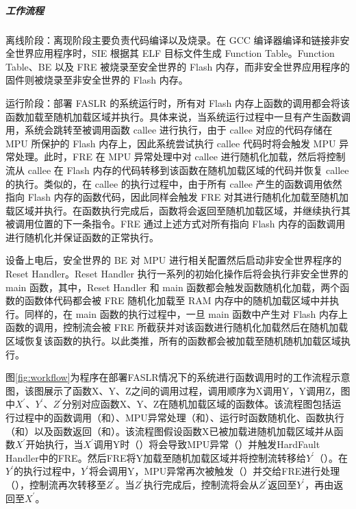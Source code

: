 \documentclass[UTF8,12pt,a4paper]{ctexart}
\numberwithin{figure}{section}
\begin{document}
\subparagraph{工作流程}
\par 离线阶段：离现阶段主要负责代码编译以及烧录。在 GCC 编译器编译和链接非安全世界应用程序时，SIE 根据其 ELF 目标文件生成 Function Table。Function Table、BE 以及 FRE 被烧录至安全世界的 Flash 内存，而非安全世界应用程序的固件则被烧录至非安全世界的 Flash 内存。
\par 运行阶段：部署 FASLR 的系统运行时，所有对 Flash 内存上函数的调用都会将该函数加载至随机加载区域并执行。具体来说，当系统运行过程中一旦有产生函数调用，系统会跳转至被调用函数 callee 进行执行，由于 callee 对应的代码存储在 MPU 所保护的 Flash 内存上，因此系统尝试执行 callee 代码时将会触发 MPU 异常处理。此时，FRE 在 MPU 异常处理中对 callee 进行随机化加载，然后将控制流从 callee 在 Flash 内存的代码转移到该函数在随机加载区域的代码并恢复 callee 的执行。类似的，在 callee 的执行过程中，由于所有 callee 产生的函数调用依然指向 Flash 内存的函数代码，因此同样会触发 FRE 对其进行随机化加载至随机加载区域并执行。在函数执行完成后，函数将会返回至随机加载区域，并继续执行其被调用位置的下一条指令。FRE 通过上述方式对所有指向 Flash 内存的函数调用进行随机化并保证函数的正常执行。
\par 设备上电后，安全世界的 BE 对 MPU 进行相关配置然后启动非安全世界程序的 Reset Handler。Reset Handler 执行一系列的初始化操作后将会执行非安全世界的 main 函数，其中，Reset Handler 和 main 函数都会触发函数随机化加载，两个函数的函数体代码都会被 FRE 随机化加载至 RAM 内存中的随机加载区域中并执行。同样的，在 main 函数的执行过程中，一旦 main 函数中产生对 Flash 内存上函数的调用，控制流会被 FRE 所截获并对该函数进行随机化加载然后在随机加载区域恢复该函数的执行。以此类推，所有的函数都会被加载至随机随机加载区域执行。
\par 图\ref{fig:workflow}为程序在部署FASLR情况下的系统进行函数调用时的工作流程示意图，该图展示了函数X、Y、Z之间的调用过程，调用顺序为X调用Y，Y调用Z，图中$X^{'}、Y^{'}、Z^{'}$分别对应函数X、Y、Z在随机加载区域的函数体。该流程图包括运行过程中的函数调用（和）、MPU异常处理（和）、运行时函数随机化、函数执行（和）以及函数返回（和）。该流程图假设函数X已被加载进随机加载区域并从函数$X^{'}$开始执行，当$X^{'}$调用Y时（）将会导致MPU异常（）并触发HardFault Handler中的FRE。然后FRE将Y加载至随机加载区域并将控制流转移给$Y^{'}$（）。在$Y^{'}$的执行过程中，$Y^{'}$将会调用Y，MPU异常再次被触发（）并交给FRE进行处理（），控制流再次转移至$Z^{'}$。当$Z^{'}$执行完成后，控制流将会从$Z^{'}$返回至$Y^{'}$，再由返回至$X^{'}$。
\end{document}
